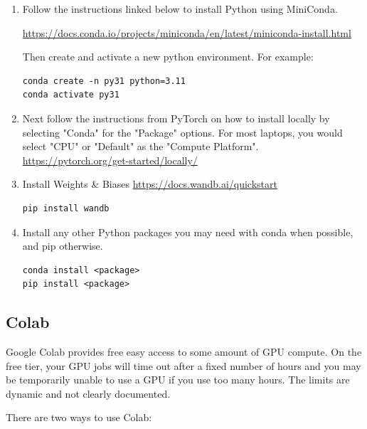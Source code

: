 \documentclass[11pt,addpoints,answers]{exam}
\begin{document}
\begin{enumerate}
\item Follow the instructions linked below to install Python using MiniConda.  

\url{https://docs.conda.io/projects/miniconda/en/latest/miniconda-install.html}

Then create and activate a new python environment. For example:
\begin{verbatim}
conda create -n py31 python=3.11
conda activate py31
\end{verbatim}
\item Next follow the instructions from PyTorch on how to install locally by selecting "Conda" for the "Package" options. For most laptops, you would select "CPU" or "Default" as the "Compute Platform". \url{https://pytorch.org/get-started/locally/}
\item Install Weights \& Biases \url{https://docs.wandb.ai/quickstart}
\begin{verbatim}
pip install wandb
\end{verbatim}
\item Install any other Python packages you may need with conda when possible, and pip otherwise.
\begin{verbatim}
conda install <package>
pip install <package>
\end{verbatim}
\end{enumerate}

\subsection*{Colab}
\label{sec:colab}

Google Colab provides free easy access to some amount of GPU compute. On the free tier, your GPU jobs will time out after a fixed number of hours and you may be temporarily unable to use a GPU if you use too many hours. The limits are dynamic and not clearly documented.

There are two ways to use Colab: 
\end{document}
